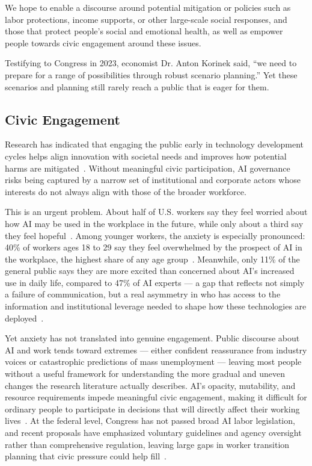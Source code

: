 \documentclass[sigconf,authordraft]{acmart}
\begin{document}
We hope to enable a discourse around potential mitigation or policies such as labor protections, income supports, or other large-scale social responses, and those that protect people's social and emotional health, as well as empower people towards civic engagement around these issues.

Testifying to Congress in 2023, economist Dr. Anton Korinek said, ``we need to prepare for a range of possibilities through robust scenario planning.'' Yet these scenarios and planning still rarely reach a public that is eager for them.


\subsection{Civic Engagement}

Research has indicated that engaging the public early in technology development cycles helps align innovation with societal needs and improves how potential harms are mitigated~\cite{oecd2024trust}. Without meaningful civic participation, AI governance risks being captured by a narrow set of institutional and corporate actors whose interests do not always align with those of the broader workforce.

This is an urgent problem. About half of U.S. workers say they feel worried about how AI may be used in the workplace in the future, while only about a third say they feel hopeful~\cite{pew2025workers}. Among younger workers, the anxiety is especially pronounced: 40\% of workers ages 18 to 29 say they feel overwhelmed by the prospect of AI in the workplace, the highest share of any age group~\cite{pew2025workers}. Meanwhile, only 11\% of the general public says they are more excited than concerned about AI's increased use in daily life, compared to 47\% of AI experts — a gap that reflects not simply a failure of communication, but a real asymmetry in who has access to the information and institutional leverage needed to shape how these technologies are deployed~\cite{pew2025experts}.

Yet anxiety has not translated into genuine engagement. Public discourse about AI and work tends toward extremes — either confident reassurance from industry voices or catastrophic predictions of mass unemployment — leaving most people without a useful framework for understanding the more gradual and uneven changes the research literature actually describes. AI's opacity, mutability, and resource requirements impede meaningful civic engagement, making it difficult for ordinary people to participate in decisions that will directly affect their working lives~\cite{sieber2025civic}. At the federal level, Congress has not passed broad AI labor legislation, and recent proposals have emphasized voluntary guidelines and agency oversight rather than comprehensive regulation, leaving large gaps in worker transition planning that civic pressure could help fill~\cite{crs2025federal}.
\end{document}
